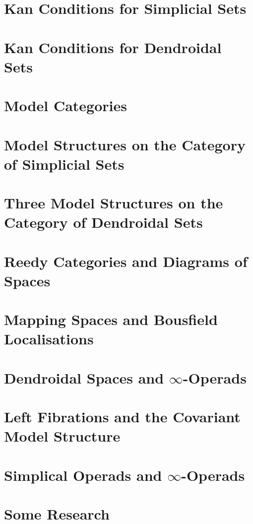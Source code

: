 \section{Kan Conditions for Simplicial Sets}

\section{Kan Conditions for Dendroidal Sets}

\section{Model Categories}

\section{Model Structures on the Category of Simplicial Sets}

\section{Three Model Structures on the Category of Dendroidal Sets}

\section{Reedy Categories and Diagrams of Spaces}

\section{Mapping Spaces and Bousfield Localisations}

\section{Dendroidal Spaces and $\infty$-Operads}

\section{Left Fibrations and the Covariant Model Structure}

\section{Simplical Operads and $\infty$-Operads}

\section{Some Research}


